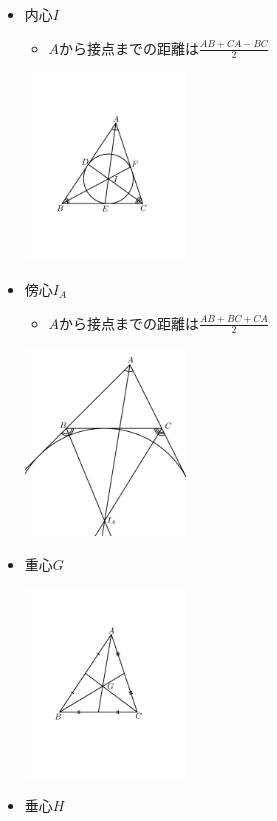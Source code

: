 \documentclass[uplatex,fleqn]{jsbook}
\begin{document}
\begin{itemize}
    \item 内心$I$
    \begin{itemize}
        \item $A$から接点までの距離は$\displaystyle \frac{AB+CA-BC}{2}$
    \end{itemize}
    \includegraphics[clip,height=5cm]{figures/Naishin.pdf}

    \item 傍心$I_A$
    \begin{itemize}
        \item $A$から接点までの距離は$\displaystyle \frac{AB+BC+CA}{2}$
    \end{itemize}
    \includegraphics[clip,height=5cm]{figures/Boushin.pdf}

    \item 重心$G$

    \includegraphics[clip,height=5cm]{figures/Jushin.pdf}

    \item 垂心$H$


\end{itemize}
\end{document}
